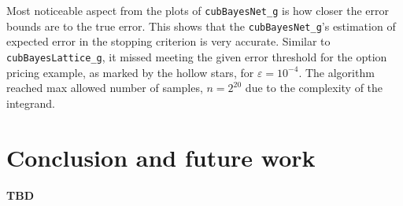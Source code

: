 \documentclass[graybox,footinfo]{svmult}
\newcommand{\code}[1]{\texttt{#1}}
\begin{document}
Most noticeable aspect from the plots of \code{cubBayesNet\_g} is how closer the error bounds are to the true error. 
This shows that the \code{cubBayesNet\_g}'s estimation of expected error in the stopping criterion is very accurate. 
Similar to \code{cubBayesLattice\_g}, it missed meeting the given error threshold for the option pricing example, as marked by the hollow stars, for $\varepsilon=10^{-4}$. The algorithm reached max allowed number of samples, $n=2^{20}$ due to the complexity of the integrand.





\section{Conclusion and future work}
\label{sec:conclusion-future-work}

\paragraph{TBD}


% 


\end{document}
